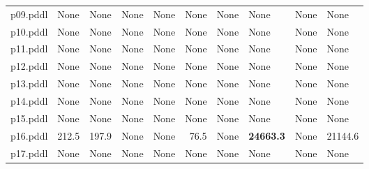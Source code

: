 \documentclass{article}
\begin{document}
\begin{tabular}{@{}lrrrrrrrrr@{}}
p09.pddl & \multicolumn{1}{|l|}{None} & \multicolumn{1}{|l|}{None} & \multicolumn{1}{|l|}{None} & \multicolumn{1}{|l|}{None} & \multicolumn{1}{|l|}{None} & \multicolumn{1}{|l|}{None} & \multicolumn{1}{|l|}{None} & \multicolumn{1}{|l|}{None} & \multicolumn{1}{|l|}{None} \\
p10.pddl & \multicolumn{1}{|l|}{None} & \multicolumn{1}{|l|}{None} & \multicolumn{1}{|l|}{None} & \multicolumn{1}{|l|}{None} & \multicolumn{1}{|l|}{None} & \multicolumn{1}{|l|}{None} & \multicolumn{1}{|l|}{None} & \multicolumn{1}{|l|}{None} & \multicolumn{1}{|l|}{None} \\
p11.pddl & \multicolumn{1}{|l|}{None} & \multicolumn{1}{|l|}{None} & \multicolumn{1}{|l|}{None} & \multicolumn{1}{|l|}{None} & \multicolumn{1}{|l|}{None} & \multicolumn{1}{|l|}{None} & \multicolumn{1}{|l|}{None} & \multicolumn{1}{|l|}{None} & \multicolumn{1}{|l|}{None} \\
p12.pddl & \multicolumn{1}{|l|}{None} & \multicolumn{1}{|l|}{None} & \multicolumn{1}{|l|}{None} & \multicolumn{1}{|l|}{None} & \multicolumn{1}{|l|}{None} & \multicolumn{1}{|l|}{None} & \multicolumn{1}{|l|}{None} & \multicolumn{1}{|l|}{None} & \multicolumn{1}{|l|}{None} \\
p13.pddl & \multicolumn{1}{|l|}{None} & \multicolumn{1}{|l|}{None} & \multicolumn{1}{|l|}{None} & \multicolumn{1}{|l|}{None} & \multicolumn{1}{|l|}{None} & \multicolumn{1}{|l|}{None} & \multicolumn{1}{|l|}{None} & \multicolumn{1}{|l|}{None} & \multicolumn{1}{|l|}{None} \\
p14.pddl & \multicolumn{1}{|l|}{None} & \multicolumn{1}{|l|}{None} & \multicolumn{1}{|l|}{None} & \multicolumn{1}{|l|}{None} & \multicolumn{1}{|l|}{None} & \multicolumn{1}{|l|}{None} & \multicolumn{1}{|l|}{None} & \multicolumn{1}{|l|}{None} & \multicolumn{1}{|l|}{None} \\
p15.pddl & \multicolumn{1}{|l|}{None} & \multicolumn{1}{|l|}{None} & \multicolumn{1}{|l|}{None} & \multicolumn{1}{|l|}{None} & \multicolumn{1}{|l|}{None} & \multicolumn{1}{|l|}{None} & \multicolumn{1}{|l|}{None} & \multicolumn{1}{|l|}{None} & \multicolumn{1}{|l|}{None} \\
p16.pddl & 212.5 & 197.9 & \multicolumn{1}{|l|}{None} & \multicolumn{1}{|l|}{None} & 76.5 & \multicolumn{1}{|l|}{None} & \textbf{24663.3} & \multicolumn{1}{|l|}{None} & 21144.6 \\
p17.pddl & \multicolumn{1}{|l|}{None} & \multicolumn{1}{|l|}{None} & \multicolumn{1}{|l|}{None} & \multicolumn{1}{|l|}{None} & \multicolumn{1}{|l|}{None} & \multicolumn{1}{|l|}{None} & \multicolumn{1}{|l|}{None} & \multicolumn{1}{|l|}{None} & \multicolumn{1}{|l|}{None} \\

\end{tabular}
\end{document}
